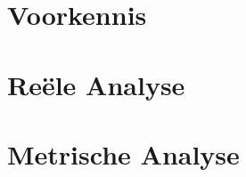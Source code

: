 \documentclass[12pt,a4paper,oneside]{book}
\begin{document}




\tableofcontents

\part{Voorkennis}




\part{Re\"ele Analyse}








\part{Metrische Analyse}






\appendix



\nocite{aI}
\nocite{gelbaum2003counterexamples}



\printindex

\listoftodos
\end{document}
